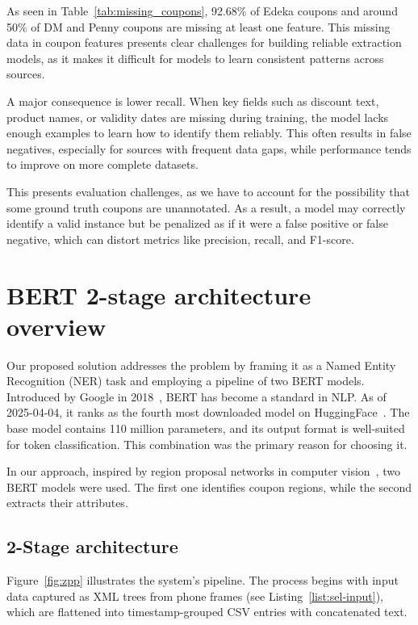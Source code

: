 \documentclass[licencjacka,en]{pracamgr}
\begin{document}
As seen in Table~\ref{tab:missing_coupons}, 92.68\% of Edeka coupons and around 50\% of DM and Penny coupons are missing at least one feature. This missing data in coupon features presents clear challenges for building reliable extraction models, as it makes it difficult for models to learn consistent patterns across sources.

A major consequence is lower recall. When key fields such as discount text, product names, or validity dates are missing during training, the model lacks enough examples to learn how to identify them reliably. This often results in false negatives, especially for sources with frequent data gaps, while performance tends to improve on more complete datasets.

This presents evaluation challenges, as we have to account for the possibility that some ground truth coupons are unannotated. As a result, a model may correctly identify a valid instance but be penalized as if it were a false positive or false negative, which can distort metrics like precision, recall, and F1-score.

\chapter{BERT 2-stage architecture overview} \label{chap:bert}
Our proposed solution addresses the problem by framing it as a Named Entity Recognition (NER) task and employing a pipeline of two BERT models. Introduced by Google in 2018~\cite{BERT_intro}, BERT has become a standard in NLP. As of 2025-04-04, it ranks as the fourth most downloaded model on HuggingFace~\cite{BERT_hf}. The base model contains 110 million parameters, and its output format is well-suited for token classification. This combination was the primary reason for choosing it.

In our approach, inspired by region proposal networks in computer vision~\cite{Region_proposal}, two BERT models were used. The first one identifies coupon regions, while the second extracts their attributes.

\section{2-Stage architecture}
Figure~\ref{fig:zpp} illustrates the system's pipeline. The process begins with input data captured as XML trees from phone frames (see Listing~\ref{list:sel-input}), which are flattened into timestamp-grouped CSV entries with concatenated text.
\end{document}

